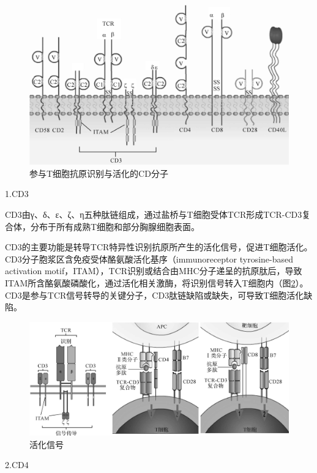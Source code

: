 \begin{figure}[!htbp]
 \centering
 \includegraphics{./images/Image00111.jpg}
 \captionsetup{justification=centering}
 \caption{参与T细胞抗原识别与活化的CD分子}
 \label{fig8-1}
  \end{figure} 

1.CD3

CD3由γ、δ、ε、ζ、η五种肽链组成，通过盐桥与T细胞受体TCR形成TCR-CD3复合体，分布于所有成熟T细胞和部分胸腺细胞表面。

CD3的主要功能是转导TCR特异性识别抗原所产生的活化信号，促进T细胞活化。CD3分子胞浆区含免疫受体酪氨酸活化基序（immunoreceptor
tyrosine-based activation
motif，ITAM），TCR识别或结合由MHC分子递呈的抗原肽后，导致ITAM所含酪氨酸磷酸化，通过活化相关激酶，将识别信号转入T细胞内（图\ref{fig8-2}）。CD3是参与TCR信号转导的关键分子，CD3肽链缺陷或缺失，可导致T细胞活化缺陷。

\begin{figure}[!htbp]
 \centering
 \includegraphics{./images/Image00112.jpg}
 \captionsetup{justification=centering}
 \caption{活化信号}
 \label{fig8-2}
  \end{figure} 

2.CD4

